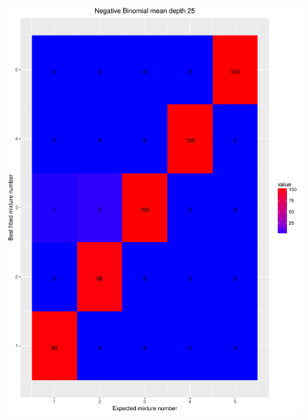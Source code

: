 \documentclass[11pt]{article}
\begin{document}
\begin{figure}[H]
\begin{center}
\includegraphics[scale=0.27]{../Results/Second_Analysis/Negative_Binomial_Confusion_Matrix_25.pdf}

\end{center}
\end{figure}
\end{document}
